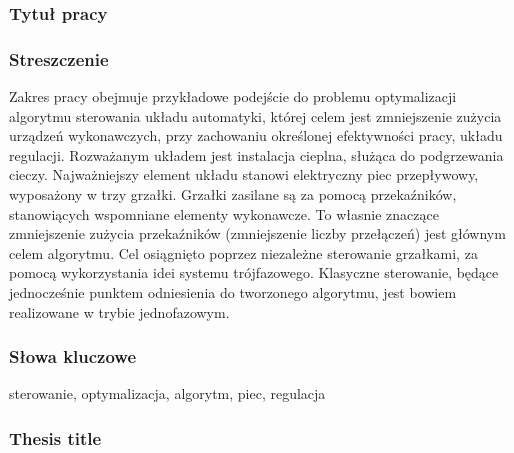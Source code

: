 \documentclass[a4paper,twoside,12pt]{book}
\begin{document}


\cleardoublepage

\rmfamily\normalfont
\pagestyle{empty}



\subsubsection*{Tytuł pracy}
\Title

\subsubsection*{Streszczenie}
Zakres pracy obejmuje przykładowe podejście do problemu optymalizacji algorytmu sterowania układu automatyki, której celem jest zmniejszenie zużycia urządzeń wykonawczych, przy zachowaniu określonej efektywności pracy, układu regulacji. Rozważanym układem jest instalacja cieplna, służąca do podgrzewania cieczy. Najważniejszy element układu stanowi elektryczny piec przepływowy, wyposażony w trzy grzałki. Grzałki zasilane są za pomocą przekaźników, stanowiących wspomniane elementy wykonawcze. To własnie znaczące zmniejszenie zużycia przekaźników (zmniejszenie liczby przełączeń) jest głównym celem algorytmu. Cel osiągnięto poprzez niezależne sterowanie grzałkami, za pomocą wykorzystania idei systemu trójfazowego. Klasyczne sterowanie, będące jednocześnie punktem odniesienia do tworzonego algorytmu, jest bowiem realizowane w trybie jednofazowym.

\subsubsection*{Słowa kluczowe}
sterowanie, optymalizacja, algorytm, piec, regulacja

\subsubsection*{Thesis title}
\begin{otherlanguage}{british}
	\TitleAlt
\end{otherlanguage}
\end{document}
